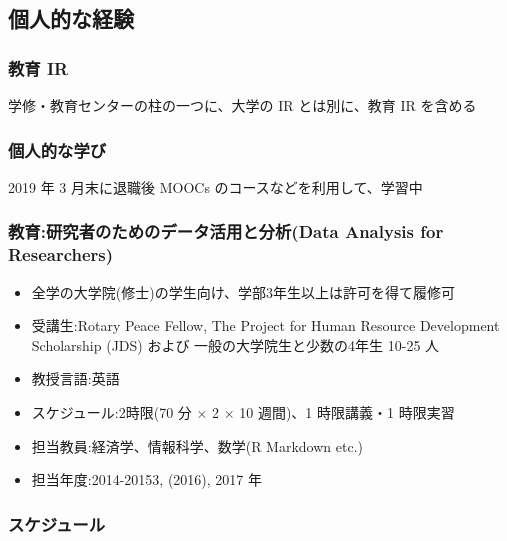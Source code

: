 \documentclass[
]{book}
\providecommand{\tightlist}{%
  \setlength{\itemsep}{0pt}\setlength{\parskip}{0pt}}
\theoremstyle{definition}
\theoremstyle{definition}
\theoremstyle{definition}
\theoremstyle{definition}
\theoremstyle{remark}
\begin{document}
\hypertarget{ux500bux4ebaux7684ux306aux7d4cux9a13}{%
\subsection{個人的な経験}\label{ux500bux4ebaux7684ux306aux7d4cux9a13}}

\hypertarget{ux6559ux80b2-ir}{%
\subsubsection{教育 IR}\label{ux6559ux80b2-ir}}

学修・教育センターの柱の一つに、大学の IR とは別に、教育 IR を含める

\hypertarget{ux500bux4ebaux7684ux306aux5b66ux3073}{%
\subsubsection{個人的な学び}\label{ux500bux4ebaux7684ux306aux5b66ux3073}}

2019 年 3 月末に退職後 MOOCs のコースなどを利用して、学習中

\hypertarget{ux6559ux80b2ux7814ux7a76ux8005ux306eux305fux3081ux306eux30c7ux30fcux30bfux6d3bux7528ux3068ux5206ux6790data-analysis-for-researchers}{%
\subsubsection{教育:研究者のためのデータ活用と分析(Data Analysis for Researchers)}\label{ux6559ux80b2ux7814ux7a76ux8005ux306eux305fux3081ux306eux30c7ux30fcux30bfux6d3bux7528ux3068ux5206ux6790data-analysis-for-researchers}}

\begin{itemize}
\tightlist
\item
  全学の大学院(修士)の学生向け、学部3年生以上は許可を得て履修可
\item
  受講生:Rotary Peace Fellow, The Project for Human Resource Development Scholarship (JDS) および 一般の大学院生と少数の4年生 10-25 人
\item
  教授言語:英語
\item
  スケジュール:2時限(70 分 × 2 × 10 週間)、1 時限講義・1 時限実習
\item
  担当教員:経済学、情報科学、数学(R Markdown etc.)
\item
  担当年度:2014-20153, (2016), 2017 年
\end{itemize}

\hypertarget{ux30b9ux30b1ux30b8ux30e5ux30fcux30eb}{%
\subsubsection{スケジュール}\label{ux30b9ux30b1ux30b8ux30e5ux30fcux30eb}}
\end{document}
